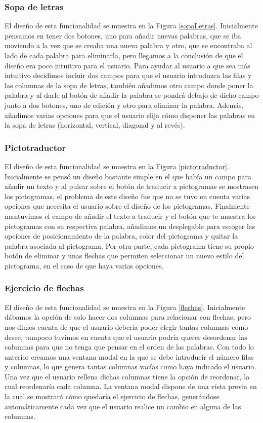 \subsubsection{Sopa de letras}
El diseño de esta funcionalidad se muestra en la Figura \ref{sopaLetras}. Inicialmente pensamos en tener dos botones, uno para añadir nuevas palabras, que se iba moviendo a la vez que se creaba una nueva palabra y otro, que se encontraba al lado de cada palabra para eliminarla, pero llegamos a la conclusión de que el diseño era poco intuitivo para el usuario. Para ayudar al usuario a que sea más intuitivo decidimos incluir dos campos para que el usuario introduzca las filas y las columnas de la sopa de letras, también añadimos otro campo donde poner la palabra y al darle al botón de añadir la palabra se pondrá debajo de dicho campo junto a dos botones, uno de edición y otro para eliminar la palabra. Además, añadimos varias opciones para que el usuario elija cómo disponer las palabras en la sopa de letras (horizontal, vertical, diagonal y al revés).

\subsubsection{Pictotraductor}
El diseño de esta funcionalidad se muestra en la Figura \ref{pictotraductor}. Inicialmente se pensó un diseño bastante simple en el que había un campo para añadir un texto y al pulsar sobre el botón de traducir a pictogramas se mostrasen los pictogramas, el problema de este diseño fue que no se tuvo en cuenta varias opciones que necesita el usuario sobre el diseño de los pictogramas. Finalmente mantuvimos el campo de añadir el texto a traducir y el botón que te muestra los pictogramas con su respectiva palabra, añadimos un desplegable para escoger las opciones de posicionamiento de la palabra, color del pictograma y quitar la palabra asociada al pictograma. Por otra parte, cada pictograma tiene su propio botón de eliminar y unas flechas que permiten seleccionar un nuevo estilo del pictograma, en el caso de que haya varias opciones. 

\subsubsection{Ejercicio de flechas}
El diseño de esta funcionalidad se muestra en la Figura \ref{flechas}. Inicialmente dábamos la opción de solo hacer dos columnas para relacionar con flechas, pero nos dimos cuenta de que el usuario debería poder elegir tantas columnas cómo desee, tampoco tuvimos en cuenta que el usuario podría querer desordenar las columnas para que no tenga que pensar en el orden de las palabras. Con todo lo anterior creamos una ventana modal en la que se debe introducir el número filas y columnas, lo que genera tantas columnas vacías como haya indicado el usuario. Una vez que el usuario rellena dichas columnas tiene la opción de reordenar, la cual reordenaría cada columna. La ventana modal dispone de una vista previa en la cual se mostrará cómo quedaría el ejercicio de flechas, generándose automáticamente cada vez que el usuario realice un cambio en alguna de las columnas. 

